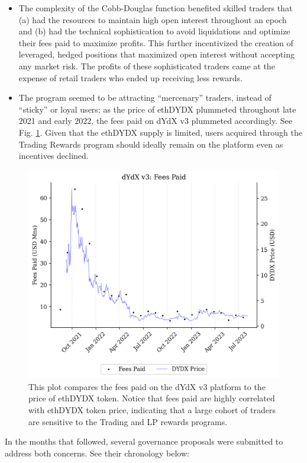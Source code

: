         \begin{itemize}
            \item The complexity of the Cobb-Douglas function benefited skilled traders that (a) had the resources to maintain high open interest throughout an epoch and (b) had the technical sophistication to avoid liquidations and optimize their fees paid to maximize profits. This further incentivized the creation of leveraged, hedged positions that maximized open interest without accepting any market risk. The profits of these sophisticated traders came at the expense of retail traders who ended up receiving less rewards.
            \item The program seemed to be attracting ``mercenary'' traders, instead of ``sticky'' or loyal users; as the price of ethDYDX plummeted throughout late 2021 and early 2022, the fees paid on dYdX v3 plummeted accordingly. See Fig. \ref{fig:fee_correlation}. Given that the ethDYDX supply is limited, users acquired through the Trading Rewards program should ideally remain on the platform even as incentives declined. 
        \end{itemize}

        \begin{figure}[htp]
            \centering
            \includegraphics[width=0.7\linewidth]{figs/fee_correlation.png}
            \caption{This plot compares the fees paid on the dYdX v3 platform to the price of ethDYDX token. Notice that fees paid are highly correlated with ethDYDX token price, indicating that a large cohort of traders are sensitive to the Trading and LP rewards programs.}
            \label{fig:fee_correlation}
        \end{figure}

        In the months that followed, several governance proposals were submitted to address both concerns. See their chronology below:

